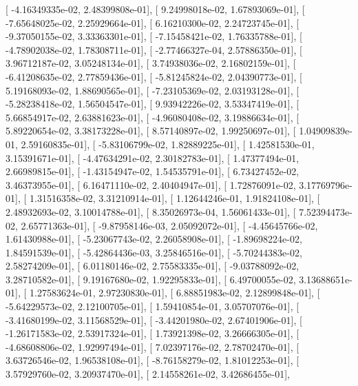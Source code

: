 \documentclass{article}
\begin{document}
       [ -4.16349335e-02,   2.48399808e-01],
       [  9.24998018e-02,   1.67893069e-01],
       [ -7.65648025e-02,   2.25929664e-01],
       [  6.16210300e-02,   2.24723745e-01],
       [ -9.37050155e-02,   3.33363301e-01],
       [ -7.15458421e-02,   1.76335788e-01],
       [ -4.78902038e-02,   1.78308711e-01],
       [ -2.77466327e-04,   2.57886350e-01],
       [  3.96712187e-02,   3.05248134e-01],
       [  3.74938036e-02,   2.16802159e-01],
       [ -6.41208635e-02,   2.77859436e-01],
       [ -5.81245824e-02,   2.04390773e-01],
       [  5.19168093e-02,   1.88690565e-01],
       [ -7.23105369e-02,   2.03193128e-01],
       [ -5.28238418e-02,   1.56504547e-01],
       [  9.93942226e-02,   3.53347419e-01],
       [  5.66854917e-02,   2.63881623e-01],
       [ -4.96080408e-02,   3.19886634e-01],
       [  5.89220654e-02,   3.38173228e-01],
       [  8.57140897e-02,   1.99250697e-01],
       [  1.04909839e-01,   2.59160835e-01],
       [ -5.83106799e-02,   1.82889225e-01],
       [  1.42581530e-01,   3.15391671e-01],
       [ -4.47634291e-02,   2.30182783e-01],
       [  1.47377494e-01,   2.66989815e-01],
       [ -1.43154947e-02,   1.54535791e-01],
       [  6.73427452e-02,   3.46373955e-01],
       [  6.16471110e-02,   2.40404947e-01],
       [  1.72876091e-02,   3.17769796e-01],
       [  1.31516358e-02,   3.31210914e-01],
       [  1.12644246e-01,   1.91824108e-01],
       [  2.48932693e-02,   3.10014788e-01],
       [  8.35026973e-04,   1.56061433e-01],
       [  7.52394473e-02,   2.65771363e-01],
       [ -9.87958146e-03,   2.05092072e-01],
       [ -4.45645766e-02,   1.61430988e-01],
       [ -5.23067743e-02,   2.26058908e-01],
       [ -1.89698224e-02,   1.84591539e-01],
       [ -5.42864436e-03,   3.25846516e-01],
       [ -5.70244383e-02,   2.58274209e-01],
       [  6.01180146e-02,   2.75583335e-01],
       [ -9.03788092e-02,   3.28710582e-01],
       [  9.19167680e-02,   1.92295833e-01],
       [  6.49700055e-02,   3.13688651e-01],
       [  1.27583624e-01,   2.97230830e-01],
       [  6.88851983e-02,   2.12899848e-01],
       [ -5.64229573e-02,   2.12100705e-01],
       [  1.59410854e-01,   3.05707076e-01],
       [ -3.41680199e-02,   3.11568529e-01],
       [ -3.44201980e-02,   2.67401906e-01],
       [ -1.26171583e-02,   2.53917324e-01],
       [  1.73921398e-02,   3.26666305e-01],
       [ -4.68608806e-02,   1.92997494e-01],
       [  7.02397176e-02,   2.78702470e-01],
       [  3.63726546e-02,   1.96538108e-01],
       [ -8.76158279e-02,   1.81012253e-01],
       [  3.57929760e-02,   3.20937470e-01],
       [  2.14558261e-02,   3.42686455e-01],
\end{document}
